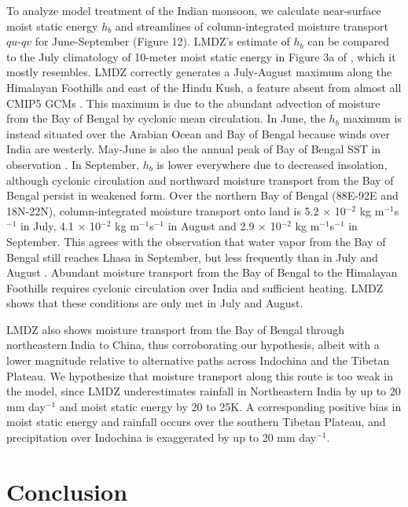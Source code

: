 \documentclass[12pt]{article}
\begin{document}
	To analyze model treatment of the Indian monsoon, we calculate near-surface moist static energy $h_b$ and streamlines of column-integrated moisture transport $qu$-$qv$ for June-September (Figure 12). LMDZ's estimate of $h_b$ can be compared to the July climatology of 10-meter moist static energy in Figure 3a of \cite{Boos2013}, which it mostly resembles. LMDZ correctly generates a July-August maximum along the Himalayan Foothills and east of the Hindu Kush, a feature absent from almost all CMIP5 GCMs \citep{Boos2013a}. This maximum is due to the abundant advection of moisture from the Bay of Bengal by cyclonic mean circulation. In June, the $h_b$ maximum is instead situated over the Arabian Ocean and Bay of Bengal because winds over India are westerly. May-June is also the annual peak of Bay of Bengal SST in observation \citep{Bhat2004}. In September, $h_b$ is lower everywhere due to decreased insolation, although cyclonic circulation and northward moisture transport from the Bay of Bengal persist in weakened form. Over the northern Bay of Bengal (88\textdegree E-92\textdegree E and 18\textdegree N-22\textdegree N), column-integrated moisture transport onto land is 5.2 $\times$ 10$^{-2}$ kg m$^{-1}$s$^{-1}$ in July, 4.1 $\times$ 10$^{-2}$ kg m$^{-1}$s$^{-1}$ in August and 2.9 $\times$ 10$^{-2}$ kg m$^{-1}$s$^{-1}$ in September. This agrees with the observation that water vapor from the Bay of Bengal still reaches Lhasa in September, but less frequently than in July and August \citep{Gao2011}. Abundant moisture transport from the Bay of Bengal to the Himalayan Foothills requires cyclonic circulation over India and sufficient heating. LMDZ shows that these conditions are only met in July and August.
	
	LMDZ also shows moisture transport from the Bay of Bengal through northeastern India to China, thus corroborating our hypothesis, albeit with a lower magnitude relative to alternative paths across Indochina and the Tibetan Plateau. We hypothesize that moisture transport along this route is too weak in the model, since LMDZ underestimates rainfall in Northeastern India by up to 20 mm day$^{-1}$ and moist static energy by 20 to 25K. A corresponding positive bias in moist static energy and rainfall occurs over the southern Tibetan Plateau, and precipitation over Indochina is exaggerated by up to 20 mm day$^{-1}$.

\section{Conclusion}
\end{document}

